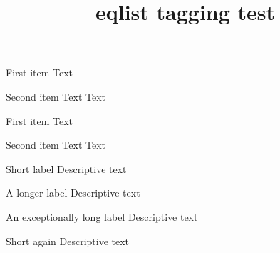 \documentclass{article}
\title{eqlist tagging test}
\begin{document}
\begin{eqlist}
\item[First item] Text
\item[Second item] Text
 Text
\end{eqlist}

\begin{eqlist*}
\item[First item] Text
\item[Second item] Text
 Text
\end{eqlist*}

\begin{eqlist}
\item[Short label] Descriptive text
\item[A longer label] Descriptive text
\item[An exceptionally long label] Descriptive text
\item[Short again] Descriptive text
\end{eqlist}
\end{document}

